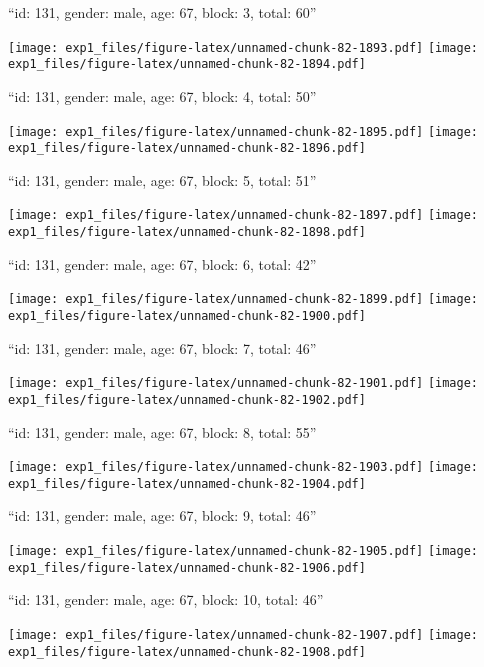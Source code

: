 \documentclass[11pt,,]{article}
\begin{document}
\newpage
[1] 

``id: 131, gender: male, age: 67, block: 3, total: 60''

\texttt{[image: exp1\_files/figure-latex/unnamed-chunk-82-1893.pdf]}
\texttt{[image: exp1\_files/figure-latex/unnamed-chunk-82-1894.pdf]}

\newpage
[1] 

``id: 131, gender: male, age: 67, block: 4, total: 50''

\texttt{[image: exp1\_files/figure-latex/unnamed-chunk-82-1895.pdf]}
\texttt{[image: exp1\_files/figure-latex/unnamed-chunk-82-1896.pdf]}

\newpage
[1] 

``id: 131, gender: male, age: 67, block: 5, total: 51''

\texttt{[image: exp1\_files/figure-latex/unnamed-chunk-82-1897.pdf]}
\texttt{[image: exp1\_files/figure-latex/unnamed-chunk-82-1898.pdf]}

\newpage
[1] 

``id: 131, gender: male, age: 67, block: 6, total: 42''

\texttt{[image: exp1\_files/figure-latex/unnamed-chunk-82-1899.pdf]}
\texttt{[image: exp1\_files/figure-latex/unnamed-chunk-82-1900.pdf]}

\newpage
[1] 

``id: 131, gender: male, age: 67, block: 7, total: 46''

\texttt{[image: exp1\_files/figure-latex/unnamed-chunk-82-1901.pdf]}
\texttt{[image: exp1\_files/figure-latex/unnamed-chunk-82-1902.pdf]}

\newpage
[1] 

``id: 131, gender: male, age: 67, block: 8, total: 55''

\texttt{[image: exp1\_files/figure-latex/unnamed-chunk-82-1903.pdf]}
\texttt{[image: exp1\_files/figure-latex/unnamed-chunk-82-1904.pdf]}

\newpage
[1] 

``id: 131, gender: male, age: 67, block: 9, total: 46''

\texttt{[image: exp1\_files/figure-latex/unnamed-chunk-82-1905.pdf]}
\texttt{[image: exp1\_files/figure-latex/unnamed-chunk-82-1906.pdf]}

\newpage
[1] 

``id: 131, gender: male, age: 67, block: 10, total: 46''

\texttt{[image: exp1\_files/figure-latex/unnamed-chunk-82-1907.pdf]}
\texttt{[image: exp1\_files/figure-latex/unnamed-chunk-82-1908.pdf]}
\end{document}
